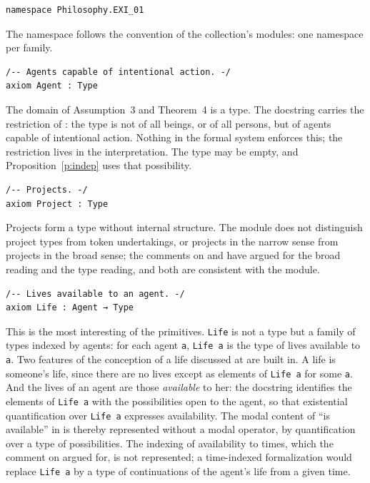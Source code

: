 \begin{lstlisting}
namespace Philosophy.EXI_01
\end{lstlisting}

The namespace follows the convention of the collection's modules: one namespace per family.

\begin{lstlisting}
/-- Agents capable of intentional action. -/
axiom Agent : Type
\end{lstlisting}

The domain of Assumption~3 and Theorem~4 is a type. The docstring carries the restriction of : the type is not of all beings, or of all persons, but of agents capable of intentional action. Nothing in the formal system enforces this; the restriction lives in the interpretation. The type may be empty, and Proposition~\ref{p:indep} uses that possibility.

\begin{lstlisting}
/-- Projects. -/
axiom Project : Type
\end{lstlisting}

Projects form a type without internal structure. The module does not distinguish project types from token undertakings, or projects in the narrow sense from projects in the broad sense; the comments on  and  have argued for the broad reading and the type reading, and both are consistent with the module.

\begin{lstlisting}
/-- Lives available to an agent. -/
axiom Life : Agent → Type
\end{lstlisting}

This is the most interesting of the primitives. \texttt{Life} is not a type but a family of types indexed by agents: for each agent \texttt{a}, \texttt{Life a} is the type of lives available to \texttt{a}. Two features of the conception of a life discussed at  are built in. A life is someone's life, since there are no lives except as elements of \texttt{Life a} for some \texttt{a}. And the lives of an agent are those \emph{available} to her: the docstring identifies the elements of \texttt{Life a} with the possibilities open to the agent, so that existential quantification over \texttt{Life a} expresses availability. The modal content of \enquote{is available} in  is thereby represented without a modal operator, by quantification over a type of possibilities. The indexing of availability to times, which the comment on  argued for, is not represented; a time-indexed formalization would replace \texttt{Life a} by a type of continuations of the agent's life from a given time.

